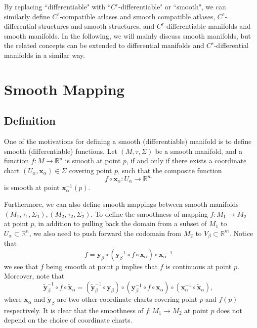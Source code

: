 \documentclass{report}
\begin{document}
By replacing ``differentiable" with ``$C^r$-differentiable" or ``smooth", we can similarly define $C^r$-compatible atlases and smooth compatible atlases, $C^r$-differential structures and smooth structures, and $C^r$-differentiable manifolds and smooth manifolds. In the following, we will mainly discuss smooth manifolds, but the related concepts can be extended to differential manifolds and $C^r$-differential manifolds in a similar way.


\chapter{Smooth Mapping}
\section{Definition}
One of the motivations for defining a smooth (differentiable) manifold is to define smooth (differentiable) functions. Let $(M,\tau,\Sigma)$ be a smooth manifold, and a function $f:M\to \mathbb{R}^n$ is smooth at point $p$, if and only if there exists a coordinate chart $(U_\alpha,\mathbf{x}_\alpha)\in\Sigma$ covering point $p$, such that the composite function
$$
f\circ \mathbf{x}_\alpha:U_\alpha\longrightarrow \mathbb{R}^m
$$
is smooth at point $\mathbf{x}^{-1}_\alpha(p)$.

Furthermore, we can also define smooth mappings between smooth manifolds $(M_1,\tau_1,\Sigma_1), (M_2,\tau_2,\Sigma_2)$. To define the smoothness of mapping $f:M_1\to M_2$ at point $p$, in addition to pulling back the domain from a subset of $M_1$ to $U_\alpha\subset\mathbb{R}^n$, we also need to push forward the codomain from $M_2$ to $V_\beta\subset\mathbb{R}^m$.
Notice that
\[
    f = \mathbf{y}_\beta\circ(\mathbf{y}^{-1}_\beta \circ f\circ \mathbf{x}_\alpha)\circ\mathbf{x}^{\hspace{2pt}-1}_\alpha
\]
we see that $f$ being smooth at point $p$ implies that $f$ is continuous at point $p$.
Moreover, note that 
\[
    \tilde{\mathbf{y}}^{-1}_\beta \circ f\circ \tilde{\mathbf{x}}_\alpha=(\tilde{\mathbf{y}}^{-1}_\beta\circ\mathbf{y}_\beta) \circ(\mathbf{y}^{-1}_\beta \circ f\circ \mathbf{x}_\alpha)\circ(\mathbf{x}^{-1}_\alpha\circ \tilde{\mathbf{x}}_\alpha),
\]
where $\tilde{\mathbf{x}}_\alpha$ and $\tilde{\mathbf{y}}_\beta$ are two other coordinate charts covering point $p$ and $f(p)$ respectively. It is clear that the smoothness of $f:M_1\to M_2$ at point $p$ does not depend on the choice of coordinate charts.
\end{document}
